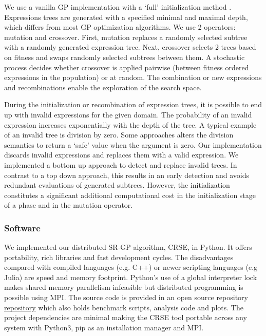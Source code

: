 We use a vanilla GP implementation with a `full' initialization method \cite{GP}. Expressions trees are generated with a specified minimal and maximal depth, which differs from most GP optimization algorithms. 
We use 2 operators: mutation and crossover. First, mutation replaces a randomly selected subtree with a randomly generated expression tree. Next, crossover selects 2 trees based on fitness and swaps randomly selected subtrees between them. A stochastic process decides whether crossover is applied pairwise (between fitness ordered expressions in the population) or at random. The combination or new expressions and recombinations enable the exploration of the search space. 

During the initialization or recombination of expression trees, it is possible to end up with invalid expressions for the given domain. The probability of an invalid expression increases exponentially with the depth of the tree. A typical example of an invalid tree is division by zero. Some approaches alters the division semantics to return a `safe' value when the argument is zero. Our implementation discards invalid expressions and replaces them with a valid expression. We implemented a bottom up approach to detect and replace invalid trees. In contrast to a top down approach, this results in an early detection and avoids redundant evaluations of generated subtrees. However, the initialization constitutes a significant additional computational cost in the initialization stage of a phase and in the mutation operator.

\subsubsection{Software}
We implemented our distributed SR-GP algorithm, CRSE, in Python. It offers portability, rich libraries and fast development cycles. The disadvantages compared with compiled languages (e.g. C++) or newer scripting languages (e.g Julia) are speed and memory footprint.
Python's use of a global interpreter lock makes shared memory parallelism infeasible but distributed programming is possible using MPI.
The source code is provided in an open source repository \href{https://bitbucket.org/bcardoen/csrm}{repository} which also holds benchmark scripts, analysis code and plots. 
The project dependencies are minimal making the CRSE tool portable across any system with Python3, pip as an installation manager and MPI.


